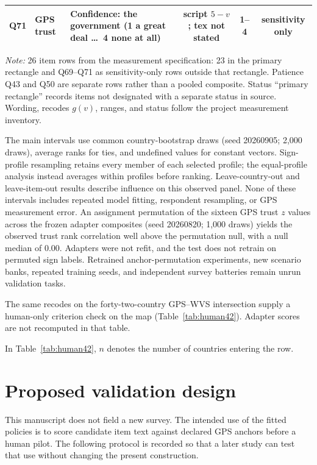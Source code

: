 \begin{table}[p]
\begin{tabularx}{\textwidth}{llXccc}
Q71 & GPS trust & Confidence: the government (1 a great deal \dots\ 4 none at all) & script $5-v$; tex not stated & 1--4 & sensitivity only \\
\bottomrule
\end{tabularx}
\par\vspace{3pt}
\raggedright\emph{Note:} 26 item rows from the measurement specification: 23 in the primary rectangle and Q69--Q71 as sensitivity-only rows outside that rectangle. Patience Q43 and Q50 are separate rows rather than a pooled composite. Status ``primary rectangle'' records items not designated with a separate status in source. Wording, recodes $g(v)$, ranges, and status follow the project measurement inventory.
\end{table}

The main intervals use common country-bootstrap draws (seed 20260905; 2,000 draws), average ranks for ties, and undefined values for constant vectors. Sign-profile resampling retains every member of each selected profile; the equal-profile analysis instead averages within profiles before ranking. Leave-country-out and leave-item-out results describe influence on this observed panel. None of these intervals includes repeated model fitting, respondent resampling, or GPS measurement error. An assignment permutation of the sixteen GPS trust $z$ values across the frozen adapter composites (seed 20260820; 1,000 draws) yields the observed trust rank correlation well above the permutation null, with a null median of $0.00$. Adapters were not refit, and the test does not retrain on permuted sign labels. Retrained anchor-permutation experiments, new scenario banks, repeated training seeds, and independent survey batteries remain unrun validation tasks.

The same recodes on the forty-two-country GPS--WVS intersection supply a human-only criterion check on the map (Table~\ref{tab:human42}). Adapter scores are not recomputed in that table.

In Table~\ref{tab:human42}, $n$ denotes the number of countries entering the row.



\section{Proposed validation design}\label{app:humanscreen}
This manuscript does not field a new survey. The intended use of the fitted policies is to score candidate item text against declared GPS anchors before a human pilot. The following protocol is recorded so that a later study can test that use without changing the present construction.

